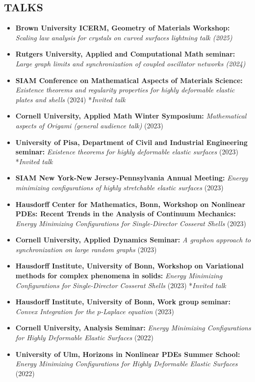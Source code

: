 \documentclass[margin]{res} %
\begin{document}
\begin{resume}
\section{TALKS}
\begin{itemize}
	\item \textbf{Brown University ICERM, Geometry of Materials Workshop:} \textit{Scaling law analysis for crystals on curved surfaces lightning talk (2025)}
	\item \textbf{Rutgers University, Applied and Computational Math seminar:} \textit{Large graph limits and synchronization of coupled oscillator networks (2024)}
	\item \textbf{SIAM Conference on Mathematical Aspects of Materials Science:} \textit{Existence theorems and regularity properties for highly deformable elastic plates and shells} (2024) *\textit{Invited talk}
	\item \textbf{Cornell University, Applied Math Winter Symposium:} \textit{Mathematical aspects of Origami (general audience talk)} (2023)
	\item \textbf{University of Pisa, Department of Civil and Industrial Engineering seminar:} \textit{Existence theorems for highly deformable elastic surfaces} (2023) *\textit{Invited talk}
	\item \textbf{SIAM New York-New Jersey-Pennsylvania Annual Meeting:} \textit{Energy minimizing configurations of highly stretchable elastic surfaces} (2023)
	\item \textbf{Hausdorff Center for Mathematics, Bonn, Workshop on Nonlinear PDEs: Recent Trends in the Analysis of Continuum Mechanics:} \textit{Energy Minimizing Configurations for Single-Director Cosserat Shells} (2023) 
	\item \textbf{Cornell University, Applied Dynamics Seminar:} \textit{A graphon approach to synchronization on large random graphs} (2023)
	\item \textbf{Hausdorff Institute, University of Bonn, Workshop on Variational methods for complex phenomena in solids:} \textit{Energy Minimizing Configurations for Single-Director Cosserat Shells} (2023) *\textit{Invited talk}
	\item \textbf{Hausdorff Institute, University of Bonn, Work group seminar:} \textit{Convex Integration for the $p$-Laplace equation} (2023)
	\item \textbf{Cornell University, Analysis Seminar:} \textit{Energy Minimizing Configurations for Highly Deformable Elastic Surfaces} (2022)
	\item \textbf{University of Ulm, Horizons in Nonlinear PDEs Summer School:} \textit{Energy Minimizing Configurations for Highly Deformable Elastic Surfaces} (2022)

\end{itemize}
\end{resume}
\end{document}
